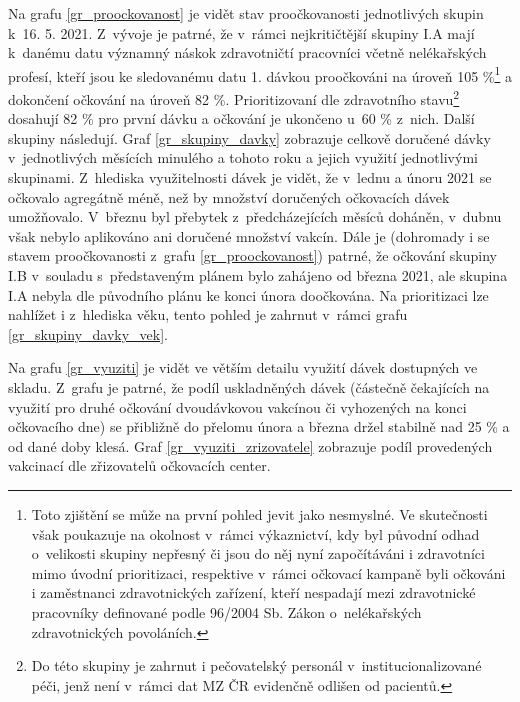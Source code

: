 Na grafu \ref{gr_proockovanost} je vidět stav proočkovanosti jednotlivých skupin k~16. 5. 2021. Z~vývoje je patrné, že v~rámci nejkritičtější skupiny I.A mají k~danému datu významný náskok zdravotničtí pracovníci včetně nelékařských profesí, kteří jsou ke sledovanému datu 1. dávkou proočkováni na úroveň 105 \%\footnote{Toto zjištění se může na první pohled jevit jako nesmyslné. Ve skutečnosti však poukazuje na okolnost v~rámci výkaznictví, kdy byl původní odhad o~velikosti skupiny nepřesný či jsou do něj nyní započítáváni i zdravotníci mimo úvodní prioritizaci, respektive v~rámci očkovací kampaně byli očkováni i zaměstnanci zdravotnických zařízení, kteří nespadají mezi zdravotnické pracovníky definované podle 96/2004 Sb. Zákon o~nelékařských zdravotnických povoláních.} a dokončení očkování na úroveň 82 \%. Prioritizovaní dle zdravotního stavu\footnote{Do této skupiny je zahrnut i pečovatelský personál v~institucionalizované péči, jenž není v~rámci dat MZ ČR evidenčně odlišen od pacientů.} dosahují 82 \% pro první dávku a očkování je ukončeno u~60 \% z~nich. Další skupiny následují. 
%
Graf \ref{gr_skupiny_davky} zobrazuje celkově doručené dávky v~jednotlivých měsících minulého a tohoto roku a jejich využití jednotlivými skupinami. Z~hlediska využitelnosti dávek je vidět, že v~lednu a únoru 2021 se očkovalo agregátně méně, než by množství doručených očkovacích dávek umožňovalo. V~březnu byl přebytek z~předcházejících měsíců doháněn, v~dubnu však nebylo aplikováno ani doručené množství vakcín. Dále je (dohromady i se stavem proočkovanosti z~grafu \ref{gr_proockovanost}) patrné, že očkování skupiny I.B v~souladu s~představeným plánem bylo zahájeno od března 2021, ale skupina I.A nebyla dle původního plánu ke konci února doočkována.
%
Na prioritizaci lze nahlížet i z~hlediska věku, tento pohled je zahrnut v~rámci grafu \ref{gr_skupiny_davky_vek}.


Na grafu \ref{gr_vyuziti} je vidět ve větším detailu využití dávek dostupných ve skladu. Z~grafu je patrné, že podíl uskladněných dávek (částečně čekajících na využití pro druhé očkování dvoudávkovou vakcínou či vyhozených na konci očkovacího dne) se přibližně do přelomu února a března držel stabilně nad 25 \% a od dané doby klesá.
%
Graf \ref{gr_vyuziti_zrizovatele} zobrazuje podíl provedených vakcinací dle zřizovatelů očkovacích center.





